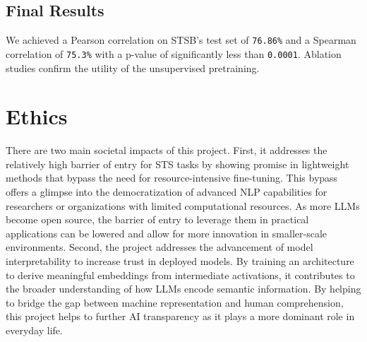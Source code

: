 \documentclass{article}
\begin{document}
\subsection{Final Results}
We achieved a Pearson correlation on STSB's test set of \verb|76.86%| and a Spearman correlation of \verb|75.3%| with a p-value of significantly less than \verb|0.0001|. Ablation studies confirm the utility of the unsupervised pretraining.

\section{Ethics}
There are two main societal impacts of this project. First, it addresses the relatively high barrier of entry for STS tasks by showing promise in lightweight methods that bypass the need for resource-intensive fine-tuning. This bypass offers a glimpse into the democratization of advanced NLP capabilities for researchers or organizations with limited computational resources. As more LLMs become open source, the barrier of entry to leverage them in practical applications can be lowered and allow for more innovation in smaller-scale environments. Second, the project addresses the advancement of model interpretability to increase trust in deployed models. By training an architecture to derive meaningful embeddings from intermediate activations, it contributes to the broader understanding of how LLMs encode semantic information. By helping to bridge the gap between machine representation and human comprehension, this project helps to further AI transparency as it plays a more dominant role in everyday life. 
\end{document}
